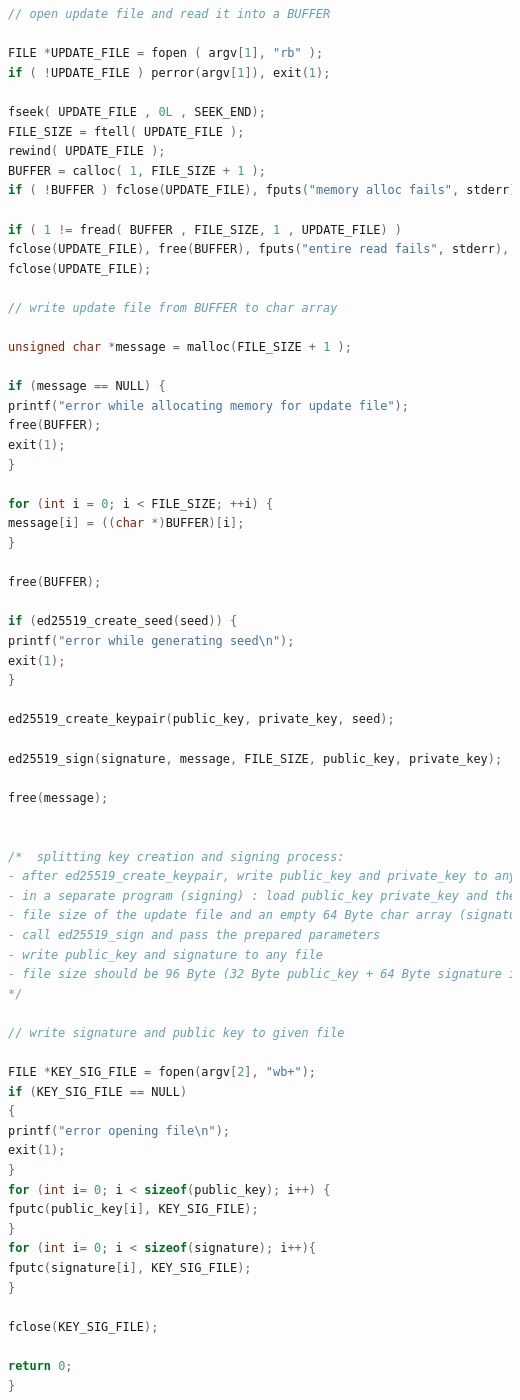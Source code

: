 \documentclass[thesis=bachelor,faculty=cb]{hsmw-thesis}
\begin{document}
{\begin{lstlisting}[language=C]
// open update file and read it into a BUFFER

FILE *UPDATE_FILE = fopen ( argv[1], "rb" );
if ( !UPDATE_FILE ) perror(argv[1]), exit(1);

fseek( UPDATE_FILE , 0L , SEEK_END);
FILE_SIZE = ftell( UPDATE_FILE );
rewind( UPDATE_FILE );
BUFFER = calloc( 1, FILE_SIZE + 1 );
if ( !BUFFER ) fclose(UPDATE_FILE), fputs("memory alloc fails", stderr), exit(1);

if ( 1 != fread( BUFFER , FILE_SIZE, 1 , UPDATE_FILE) )
fclose(UPDATE_FILE), free(BUFFER), fputs("entire read fails", stderr), exit(1);
fclose(UPDATE_FILE);

// write update file from BUFFER to char array

unsigned char *message = malloc(FILE_SIZE + 1 );

if (message == NULL) {
printf("error while allocating memory for update file");
free(BUFFER);
exit(1);
}

for (int i = 0; i < FILE_SIZE; ++i) {
message[i] = ((char *)BUFFER)[i];
}

free(BUFFER);

if (ed25519_create_seed(seed)) {
printf("error while generating seed\n");
exit(1);
}

ed25519_create_keypair(public_key, private_key, seed);

ed25519_sign(signature, message, FILE_SIZE, public_key, private_key);

free(message);


/*  splitting key creation and signing process:
- after ed25519_create_keypair, write public_key and private_key to any file
- in a separate program (signing) : load public_key private_key and the update file ("message") into char arrays
- file size of the update file and an empty 64 Byte char array (signature) are needed
- call ed25519_sign and pass the prepared parameters
- write public_key and signature to any file
- file size should be 96 Byte (32 Byte public_key + 64 Byte signature in that specific order)
*/

// write signature and public key to given file

FILE *KEY_SIG_FILE = fopen(argv[2], "wb+");
if (KEY_SIG_FILE == NULL)
{
printf("error opening file\n");
exit(1);
}
for (int i= 0; i < sizeof(public_key); i++) {
fputc(public_key[i], KEY_SIG_FILE);
}
for (int i= 0; i < sizeof(signature); i++){
fputc(signature[i], KEY_SIG_FILE);
}

fclose(KEY_SIG_FILE);

return 0;
}	
\end{lstlisting}
}
\end{document}
